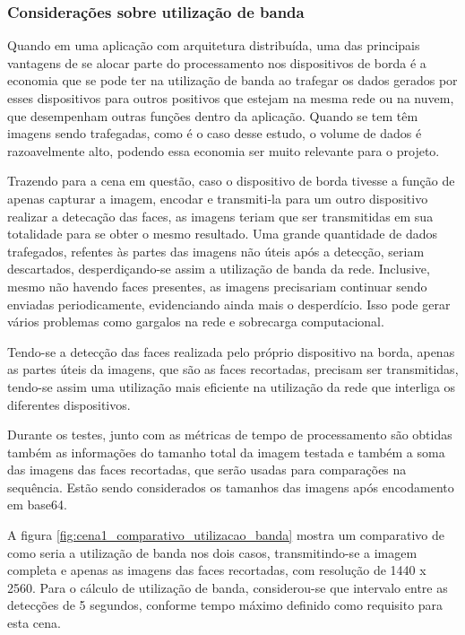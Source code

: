 \subsubsection{Considerações sobre utilização de banda}

Quando em uma aplicação com arquitetura distribuída, uma das principais vantagens de se alocar parte do processamento nos dispositivos de borda é a economia que se pode ter na utilização de banda ao trafegar os dados gerados por esses dispositivos para outros positivos que estejam na mesma rede ou na nuvem, que desempenham outras funções dentro da aplicação. Quando se tem têm imagens sendo trafegadas, como é o caso desse estudo, o volume de dados é razoavelmente alto, podendo essa economia ser muito relevante para o projeto.

Trazendo para a cena em questão, caso o dispositivo de borda tivesse a função de apenas capturar a imagem, encodar e transmiti-la para um outro dispositivo realizar a detecação das faces, as imagens teriam que ser transmitidas em sua totalidade para se obter o mesmo resultado. Uma grande quantidade de dados trafegados, refentes às partes das imagens não úteis após a detecção, seriam descartados, desperdiçando-se assim a utilização de banda da rede. Inclusive, mesmo não havendo faces presentes, as imagens precisariam continuar sendo enviadas periodicamente, evidenciando ainda mais o desperdício. Isso pode gerar vários problemas como gargalos na rede e sobrecarga computacional.

Tendo-se a detecção das faces realizada pelo próprio dispositivo na borda, apenas as partes úteis da imagens, que são as faces recortadas, precisam ser transmitidas, tendo-se assim uma utilização mais eficiente na utilização da rede que interliga os diferentes dispositivos.

Durante os testes, junto com as métricas de tempo de processamento são obtidas também as informações do tamanho total da imagem testada e também a soma das imagens das faces recortadas, que serão usadas para comparações na sequência. Estão sendo considerados os tamanhos das imagens após encodamento em base64.

A figura \ref{fig:cena1_comparativo_utilizacao_banda} mostra um comparativo de como seria a utilização de banda nos dois casos, transmitindo-se a imagem completa e apenas as imagens das faces recortadas, com resolução de 1440 x 2560. Para o cálculo de utilização de banda, considerou-se que intervalo entre as detecções de 5 segundos, conforme tempo máximo definido como requisito para esta cena.


